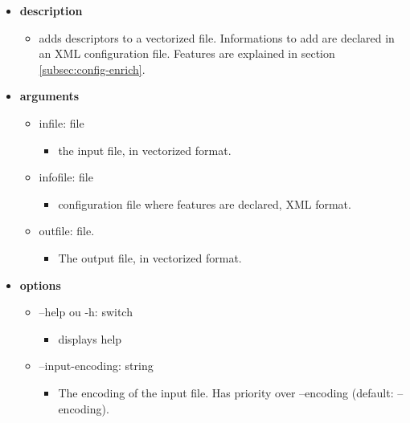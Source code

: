 \documentclass[manual-fr.tex]{subfiles}
\begin{document}
\begin{itemize}
    \item[] \textbf{description}
        \begin{itemize}
            \item[] adds descriptors to a vectorized file. Informations to add are declared in an XML configuration file. Features are explained in section \ref{subsec:config-enrich}.
        \end{itemize}
    \item[] \textbf{arguments}
        \begin{itemize}
            \item[] infile: file
                \begin{itemize}
                    \item[] the input file, in vectorized format.
                \end{itemize}
            \item[] infofile: file
                \begin{itemize}
                    \item[] configuration file where features are declared, XML format.
                \end{itemize}
            \item[] outfile: file.
                \begin{itemize}
                    \item[] The output file, in vectorized format.
                \end{itemize}
        \end{itemize}
    \item[] \textbf{options}
        \begin{itemize}
            \item[] --help ou -h: switch
                \begin{itemize}
                    \item[] displays help
                \end{itemize}
            \item[] --input-encoding: string
                \begin{itemize}
                    \item[] The encoding of the input file. Has priority over --encoding (default: --encoding).

\end{itemize}
\end{itemize}
\end{itemize}
\end{document}
